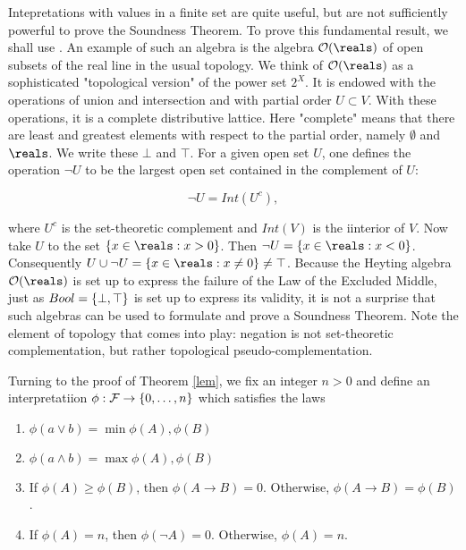Intepretations with values in a finite set are quite useful, but are not sufficiently powerful to prove the Soundness Theorem. To prove this fundamental result, we shall use .  An example of such an algebra is the algebra $\opensets(\reals)$ of open subsets of the real line in the usual topology.  We think of $\opensets(\reals)$ as a sophisticated "topological version" of the power set $2^X$. It is endowed with the operations of union and intersection and with partial order $U \subset V$.  With these operations, it is a complete distributive lattice. Here "complete" means that there are least and greatest elements with respect to the partial order, namely $\emptyset$ and $\reals$.  We write these $\bot$ and $\top$. For a given open set $U$, one defines the operation $\neg U$ to be the largest open set contained in the complement of $U$:

$$
\neg U = Int(U^c),
$$

where $U^c$ is the set-theoretic complement and $Int(V)$ is the iinterior of $V$.
  Now take $U$ to the set $\set{ x \in \reals :  x > 0}$.  Then $\neg U = \set{ x \in \reals :  x < 0}$.    Consequently $U \cup \neg U = \set{x \in \reals : x \ne 0} \ne \top$.  Because the Heyting algebra $\opensets(\reals)$ is set up to express the failure of the Law of the Excluded Middle, just as $Bool = \{ \bot, \top \}$ is set up to express its validity, it is not a surprise that such algebras can be used to formulate and prove a Soundness Theorem.  Note the element of topology that comes into play: negation is not set-theoretic complementation, but rather topological pseudo-complementation.

Turning to the proof of Theorem \ref{lem},  we fix an integer $n > 0$ and define an interpretatiion $\phi: \mathcal{F} \to \{ 0, \ldots, n \}$ which satisfies the laws


\begin{enumerate}

\item $\phi(a \lor b) = \min \phi(A), \phi(B)$

\item  $\phi(a \land b) = \max \phi(A), \phi(B)$

\item If $\phi(A) \ge \phi(B)$, then $\phi(A \to B) = 0$.  Otherwise, 
$\phi(A \to B) = \phi(B)$.

\item If $\phi(A) = n$, then $\phi(\neg A) = 0$.  Otherwise, $\phi(A) = n$.

\end{enumerate}

